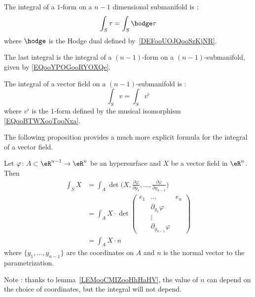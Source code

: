\begin{definition}       \label{DEFooAXFXooWiMLKP}
    The integral of a \( 1\)-form on a \( n-1\) dimensional submanifold is :
    \begin{equation}
        \int_S\tau=\int_S\hodge\tau
    \end{equation}
    where \( \hodge\) is the Hodge dual defined by~\ref{DEFooUOJQooSzKjNR}.
\end{definition}
The last integral is the integral of a \( (n-1)\)-form on a \( (n-1)\)-submanifold, given by \eqref{EQooYPOGooRYOXQe}.

\begin{definition}      \label{DEFooAXZGooJairMQ}
    The integral of a vector field on a \( (n-1)\)-submanifold is :
    \begin{equation}
        \int_Sv=\int_Sv^{\flat}
    \end{equation}
    where \( v^{\flat}\) is the \( 1\)-form defined by the musical isomorphism \eqref{EQooBTWXooTqoNxa}.
\end{definition}

The following proposition provides a much more explicit formula for the integral of a vector field.

\begin{proposition}     \label{PROPooETLZooAVsrwy}
    Let \( \varphi\colon A\subset \eR^{n-1}\to \eR^n\) be an hypersurface and \( X\) be a vector field in \( \eR^n\). Then
    \begin{subequations}
        \begin{align}
            \int_SX&=\int_A\det\big( X,\frac{ \partial \varphi }{ \partial y_1 },\ldots, \frac{ \partial \varphi }{ \partial y_{n-1} } \big)  \label{SUBEQooWJSPooImJjQN}\\
            &=\int_A X\cdot\det\begin{pmatrix}
                e_1    &   \ldots    &   e_n    \\
                &   \partial_{y_1}\varphi    &       \\
                &    \vdots   &       \\
                &   \partial_{y_{n-1}}\varphi    &
            \end{pmatrix}\\
            &=\int_A X\cdot n
        \end{align}
    \end{subequations}
    where \( \{ y_1,\ldots, y_{n-1} \}\) are the coordinates on \( A\) and \( n\) is the normal vector to the parametrization.
\end{proposition}
Note : thanks to lemma~\ref{LEMooCMIZooHhHaHV}, the value of \( n\) can depend on the choice of coordinates, but the integral will not depend.

